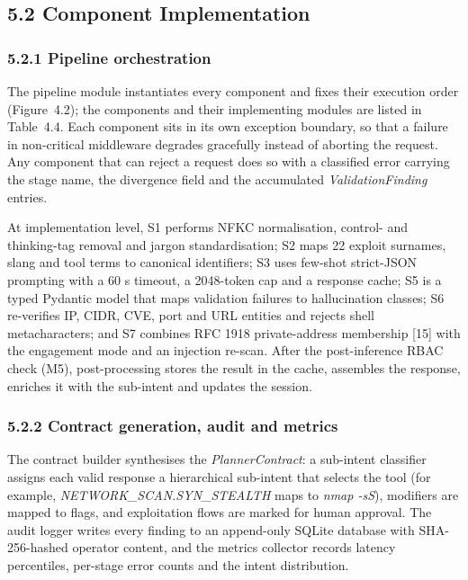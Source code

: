 \documentclass[
]{article}
\begin{document}
\hypertarget{component-implementation}{%
\subsection{5.2 Component
Implementation}\label{component-implementation}}

\hypertarget{pipeline-orchestration}{%
\subsubsection{5.2.1 Pipeline
orchestration}\label{pipeline-orchestration}}

The pipeline module instantiates every component and fixes their
execution order (Figure~4.2); the components and their implementing
modules are listed in Table~4.4. Each component sits in its own
exception boundary, so that a failure in non-critical middleware
degrades gracefully instead of aborting the request. Any component that
can reject a request does so with a classified error carrying the stage
name, the divergence field and the accumulated \emph{ValidationFinding}
entries.

At implementation level, S1 performs NFKC normalisation, control- and
thinking-tag removal and jargon standardisation; S2 maps 22 exploit
surnames, slang and tool terms to canonical identifiers; S3 uses
few-shot strict-JSON prompting with a 60 s timeout, a 2048-token cap and
a response cache; S5 is a typed Pydantic model that maps validation
failures to hallucination classes; S6 re-verifies IP, CIDR, CVE, port
and URL entities and rejects shell metacharacters; and S7 combines RFC
1918 private-address membership {[}15{]} with the engagement mode and an
injection re-scan. After the post-inference RBAC check (M5),
post-processing stores the result in the cache, assembles the response,
enriches it with the sub-intent and updates the session.

\hypertarget{contract-generation-audit-and-metrics}{%
\subsubsection{5.2.2 Contract generation, audit and
metrics}\label{contract-generation-audit-and-metrics}}

The contract builder synthesises the \emph{PlannerContract}: a
sub-intent classifier assigns each valid response a hierarchical
sub-intent that selects the tool (for example,
\emph{NETWORK\_SCAN.SYN\_STEALTH} maps to \emph{nmap -sS}), modifiers
are mapped to flags, and exploitation flows are marked for human
approval. The audit logger writes every finding to an append-only SQLite
database with SHA-256-hashed operator content, and the metrics collector
records latency percentiles, per-stage error counts and the intent
distribution.
\end{document}
